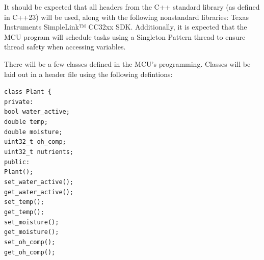 \begin{flushleft}
    It should be expected that all headers from the C++ standard library (as
    defined in C++23) will be used, along with the following nonstandard
    libraries: Texas Instruments SimpleLink™ CC32xx SDK. Additionally, it is
    expected that the MCU program will schedule tasks using a Singleton Pattern
    thread to ensure thread safety when accessing variables.
\end{flushleft}
\begin{flushleft}
    There will be a few classes defined in the MCU's programming.
    Classes will be laid out in a header file using the following defintions:
    \begin{flushleft}
        \texttt{class Plant \{}  \\
        \quad\texttt{private:} \\
        \quad\quad\texttt{bool water\_active;} \\
        \quad\quad\texttt{double temp;} \\
        \quad\quad\texttt{double moisture;} \\
        \quad\quad\texttt{uint32\_t oh\_comp;} \\
        \quad\quad\texttt{uint32\_t nutrients;} \\
        \quad\texttt{public:} \\
        \quad\quad\texttt{Plant();} \\
        \quad\quad\texttt{set\_water\_active();} \\
        \quad\quad\texttt{get\_water\_active();} \\
        \quad\quad\texttt{set\_temp();} \\
        \quad\quad\texttt{get\_temp();} \\
        \quad\quad\texttt{set\_moisture();} \\
        \quad\quad\texttt{get\_moisture();} \\
        \quad\quad\texttt{set\_oh\_comp();} \\
        \quad\quad\texttt{get\_oh\_comp();} \\

\end{flushleft}
\end{flushleft}
